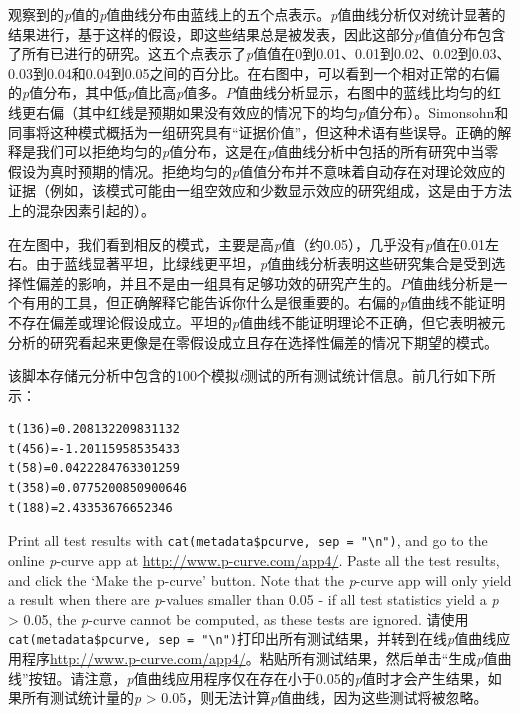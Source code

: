 \documentclass[
  letterpaper,
  DIV=11,
  numbers=noendperiod]{scrreprt}
\begin{document}
观察到的\emph{p}值的\emph{p}值曲线分布由蓝线上的五个点表示。\emph{p}值曲线分析仅对统计显著的结果进行，基于这样的假设，即这些结果总是被发表，因此这部分\emph{p}值值分布包含了所有已进行的研究。这五个点表示了\emph{p}值值在0到0.01、0.01到0.02、0.02到0.03、0.03到0.04和0.04到0.05之间的百分比。在右图中，可以看到一个相对正常的右偏的\emph{p}值分布，其中低\emph{p}值比高\emph{p}值多。\emph{P}值曲线分析显示，右图中的蓝线比均匀的红线更右偏（其中红线是预期如果没有效应的情况下的均匀\emph{p}值分布）。Simonsohn和同事将这种模式概括为一组研究具有``证据价值''，但这种术语有些误导。正确的解释是我们可以拒绝均匀的\emph{p}值分布，这是在\emph{p}值曲线分析中包括的所有研究中当零假设为真时预期的情况。拒绝均匀的\emph{p}值值分布并不意味着自动存在对理论效应的证据（例如，该模式可能由一组空效应和少数显示效应的研究组成，这是由于方法上的混杂因素引起的）。

在左图中，我们看到相反的模式，主要是高\emph{p}值（约0.05），几乎没有\emph{p}值在0.01左右。由于蓝线显著平坦，比绿线更平坦，\emph{p}值曲线分析表明这些研究集合是受到选择性偏差的影响，并且不是由一组具有足够功效的研究产生的。\emph{P}值曲线分析是一个有用的工具，但正确解释它能告诉你什么是很重要的。右偏的\emph{p}值曲线不能证明不存在偏差或理论假设成立。平坦的\emph{p}值曲线不能证明理论不正确，但它表明被元分析的研究看起来更像是在零假设成立且存在选择性偏差的情况下期望的模式。

该脚本存储元分析中包含的100个模拟\emph{t}测试的所有测试统计信息。前几行如下所示：

\begin{verbatim}
t(136)=0.208132209831132
t(456)=-1.20115958535433
t(58)=0.0422284763301259
t(358)=0.0775200850900646
t(188)=2.43353676652346
\end{verbatim}

Print all test results with
\texttt{cat(metadata\$pcurve,\ sep\ =\ "\textbackslash{}n")}, and go to
the online \emph{p}-curve app at \url{http://www.p-curve.com/app4/}.
Paste all the test results, and click the `Make the p-curve' button.
Note that the \emph{p}-curve app will only yield a result when there are
\emph{p}-values smaller than 0.05 - if all test statistics yield a
\emph{p} \textgreater{} 0.05, the \emph{p}-curve cannot be computed, as
these tests are ignored.
请使用\texttt{cat(metadata\$pcurve,\ sep\ =\ "\textbackslash{}n")}打印出所有测试结果，并转到在线\emph{p}值曲线应用程序\url{http://www.p-curve.com/app4/}。粘贴所有测试结果，然后单击``生成\emph{p}值曲线''按钮。请注意，\emph{p}值曲线应用程序仅在存在小于0.05的\emph{p}值时才会产生结果，如果所有测试统计量的\emph{p}
\textgreater{} 0.05，则无法计算\emph{p}值曲线，因为这些测试将被忽略。
\end{document}
